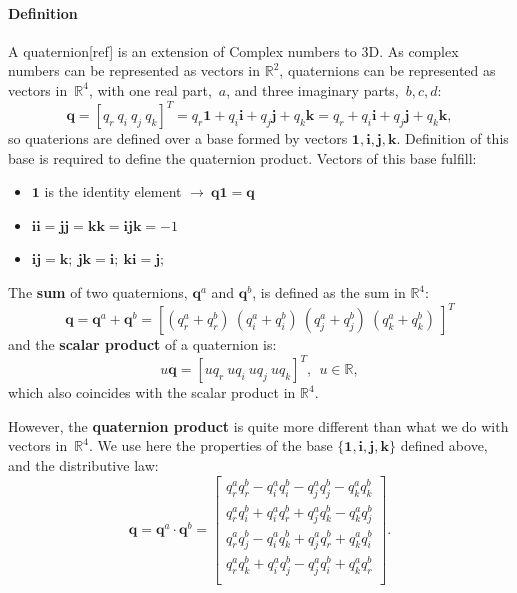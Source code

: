 \paragraph{Definition} A quaternion[ref] is an extension of Complex numbers to 3D. As complex numbers can be represented as vectors in $\mathbb{R}^2$, quaternions can be represented as vectors in~$\mathbb{R}^4$, with one real part,~$a$, and three imaginary parts,~$b,c,d$: 
\begin{equation}
 \mathbf{q} = [q_r\ q_i\ q_j\ q_k]^T = 
    q_r\mathbf{1} + q_i\mathbf{i} + q_j\mathbf{j} + q_k\mathbf{k}=
    q_r + q_i\mathbf{i} + q_j\mathbf{j} + q_k\mathbf{k}, 
\end{equation}
so quaterions are defined over a base formed by vectors $\mathbf{1},\mathbf{i},\mathbf{j},\mathbf{k}$. Definition of this base is required to define the quaternion product. Vectors of this base fulfill:
\begin{itemize}
 \item $\mathbf{1}$ is the identity element $\rightarrow\ \mathbf{q}\mathbf{1} = \mathbf{q}$
 \item $\mathbf{i}\mathbf{i}=\mathbf{j}\mathbf{j}=\mathbf{k}\mathbf{k}=\mathbf{i}\mathbf{j}\mathbf{k}=-1$
 \item $\mathbf{i}\mathbf{j}=\mathbf{k};\ \mathbf{j}\mathbf{k}=\mathbf{i};\ \mathbf{k}\mathbf{i}=\mathbf{j};$
\end{itemize}

The \textbf{sum} of two quaternions, $\mathbf{q}^a$ and $\mathbf{q}^b$, is defined as the sum in $\mathbb{R}^4$:
\begin{equation}
 \mathbf{q} = \mathbf{q}^a + \mathbf{q}^b = [ (q^a_r+q^b_r)\ 
					      (q^a_i+q^b_i)\ 
					      (q^a_j+q^b_j)\
					      (q^a_k+q^b_k)\ ]^T
\end{equation}
and the \textbf{scalar product} of a quaternion is:
\begin{equation}
 u\mathbf{q} = [ uq_r\ uq_i\ uq_j\ uq_k]^T, \ \ u \in \mathbb{R}, 
\end{equation}
which also coincides with the scalar product in $\mathbb{R}^4$.

However, the \textbf{quaternion product} is quite more different than what we do with vectors in~$\mathbb{R}^4$. We use here the properties of the base $\{\mathbf{1,i,j,k}\}$ defined above, and the distributive law: 
\begin{equation}
 \mathbf{q} = \mathbf{q}^a \cdot \mathbf{q}^b =
 \left[
 \begin{array}{c}
    q^a_rq^b_r - q^a_iq^b_i - q^a_jq^b_j - q^a_kq^b_k\\
    q^a_rq^b_i + q^a_iq^b_r + q^a_jq^b_k - q^a_kq^b_j\\
    q^a_rq^b_j - q^a_iq^b_k + q^a_jq^b_r + q^a_kq^b_i\\
    q^a_rq^b_k + q^a_iq^b_j - q^a_jq^b_i + q^a_kq^b_r\\
 \end{array}
 \right]. 
\end{equation}

